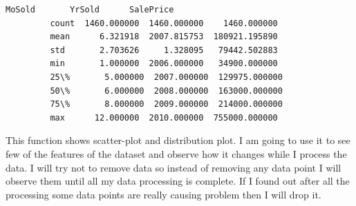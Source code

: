 \documentclass[11pt, a4paper , landscape]{article}
\begin{document}
\begin{Verbatim}[commandchars=\\\{\}]
                     MoSold       YrSold      SalePrice  
         count  1460.000000  1460.000000    1460.000000  
         mean      6.321918  2007.815753  180921.195890  
         std       2.703626     1.328095   79442.502883  
         min       1.000000  2006.000000   34900.000000  
         25\%       5.000000  2007.000000  129975.000000  
         50\%       6.000000  2008.000000  163000.000000  
         75\%       8.000000  2009.000000  214000.000000  
         max      12.000000  2010.000000  755000.000000  
\end{Verbatim}
            
    This function shows scatter-plot and distribution plot. I am going to
use it to see few of the features of the dataset and observe how it
changes while I process the data. I will try not to remove data so
instead of removing any data point I will observe them until all my data
processing is complete. If I found out after all the processing some
data points are really causing problem then I will drop it.
\end{document}
